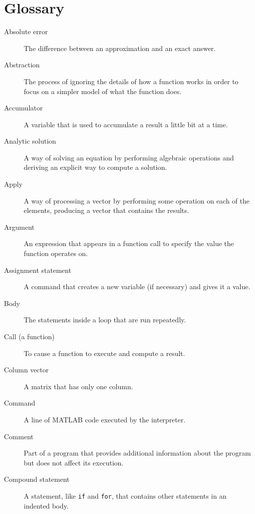 

\chapter*{Glossary}

\begin{description}


\item[Absolute error] The difference between an approximation and
an exact answer.

\item[Abstraction] The process of ignoring the details of how
a function works in order to focus on a simpler model of what the
function does.

\item[Accumulator] A variable that is used to accumulate a result
a little bit at a time.

\item[Analytic solution] A way of solving an equation by performing
algebraic operations and deriving an explicit way to
compute a solution.

\item[Apply] A way of processing a vector by performing some operation
on each of the elements, producing a vector that contains the
results.

\item[Argument] An expression that appears in a function call to
specify the value the function operates on.

\item[Assignment statement] A command that creates a new variable
(if necessary) and gives it a value.

\item[Body] The statements inside a loop that are run
repeatedly.

\item[Call (a function)] To cause a function to execute and compute a result.

\item[Column vector] A matrix that has only one column.

\item[Command] A line of MATLAB code executed by the interpreter.

\item[Comment] Part of a program that provides additional information
about the program but does not affect its execution.

\item[Compound statement] A statement, like \lstinline{if} and \lstinline{for}, that
contains other statements in an indented body.


\end{description}

